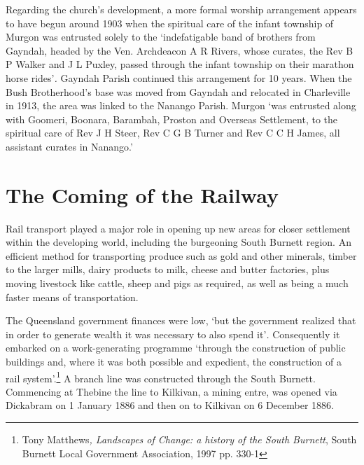 Regarding the church's development, a more formal worship arrangement appears to have begun around 1903 when the spiritual care of the infant township of Murgon was entrusted solely to the `indefatigable band of brothers from Gayndah, headed by the Ven. Archdeacon A R Rivers, whose curates, the Rev B P Walker and J L Puxley, passed through the infant township on their marathon horse rides'\emph{.} Gayndah Parish continued this arrangement for 10 years. When the Bush Brotherhood's base was moved from Gayndah and relocated in Charleville in 1913, the area was linked to the Nanango Parish. Murgon `was entrusted along with Goomeri, Boonara, Barambah, Proston and Overseas Settlement, to the spiritual care of Rev J H Steer, Rev C G B Turner and Rev C C H James, all assistant curates in Nanango.'



\section{The Coming of the Railway}



Rail transport played a major role in opening up new areas for closer settlement within the developing world, including the burgeoning South Burnett region. An efficient method for transporting produce such as gold and other minerals, timber to the larger mills, dairy products to milk, cheese and butter factories, plus moving livestock like cattle, sheep and pigs as required, as well as being a much faster means of transportation.



The Queensland government finances were low, `but the government realized that in order to generate wealth it was necessary to also spend it'\emph{.} Consequently it embarked on a work-generating programme `through the construction of public buildings and, where it was both possible and expedient, the construction of a rail system'.\footnote{Tony Matthews\emph{, Landscapes of Change: a history of the South Burnett}, South Burnett Local Government Association, 1997 pp. 330-1} A branch line was constructed through the South Burnett. Commencing at Thebine the line to Kilkivan, a mining entre, was opened via Dickabram on 1 January 1886 and then on to Kilkivan on 6 December 1886.


